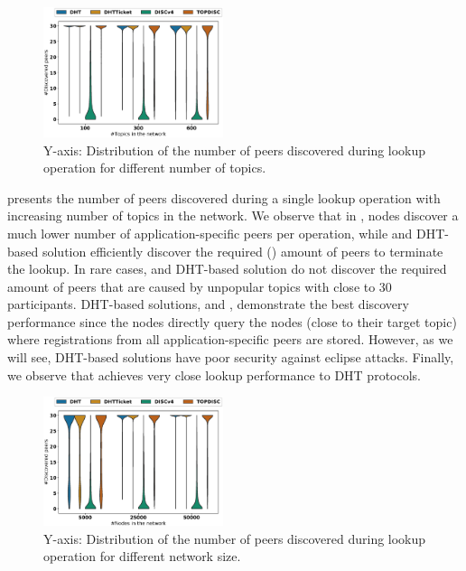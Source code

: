 \begin{figure}[!h]
\includegraphics[width=0.470\textwidth]{results/no_split/violin_topic_discovered.eps}
\caption{Y-axis: Distribution of the number of peers discovered during lookup operation for different number of topics.}
\label{fig:discoveredPerTopic}
\end{figure}

 presents the number of peers discovered during a single lookup operation with increasing number of topics in the network. We observe that in \discv, nodes discover a much lower number of application-specific peers per operation, while \sysname and DHT-based solution efficiently discover the required () amount of peers to terminate the lookup. In rare cases, \sysname and DHT-based solution do not discover the required amount of peers that are caused by unpopular topics with close to 30 participants. 
DHT-based solutions, \altname and \altnameticket, demonstrate the best discovery performance since the nodes directly query the nodes (close to their target topic) where registrations from all application-specific peers are stored. However, as we will see, DHT-based solutions have poor security against eclipse attacks. 
Finally, we observe that \sysname achieves very close lookup performance to DHT protocols. 


\begin{figure}[!h]
\includegraphics[width=0.470\textwidth]{results/no_split/violin_size_discovered.eps}
\caption{Y-axis: Distribution of the number of peers discovered during lookup operation for different network size.}
\label{fig:discoveredPerSize}
\end{figure}

